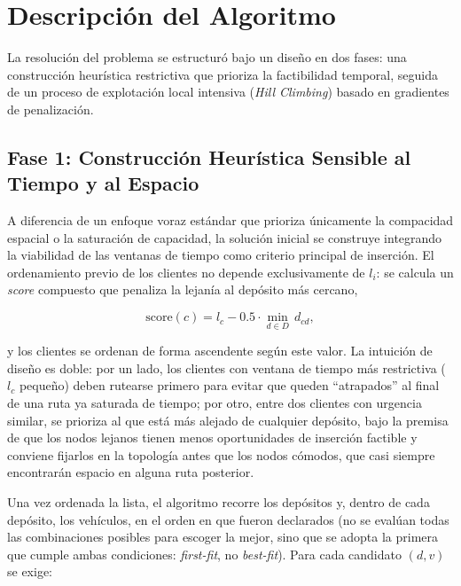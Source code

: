 \documentclass[letter, 10pt]{article}
\begin{document}
\section{Descripci\'on del Algoritmo}

La resoluci\'on del problema se estructur\'o bajo un dise\~no en dos fases: una construcci\'on heur\'istica restrictiva que prioriza la factibilidad temporal, seguida de un proceso de explotaci\'on local intensiva (\textit{Hill Climbing}) basado en gradientes de penalizaci\'on.

\subsection{Fase 1: Construcci\'on Heur\'istica Sensible al Tiempo y al Espacio}

A diferencia de un enfoque voraz est\'andar que prioriza \'unicamente la compacidad espacial o la saturaci\'on de capacidad, la soluci\'on inicial se construye integrando la viabilidad de las ventanas de tiempo como criterio principal de inserci\'on. El ordenamiento previo de los clientes no depende exclusivamente de $l_i$: se calcula un \textit{score} compuesto que penaliza la lejan\'ia al dep\'osito m\'as cercano,

\begin{equation}
\text{score}(c) = l_c - 0.5 \cdot \min_{d \in D} \, d_{cd},
\end{equation}

y los clientes se ordenan de forma ascendente seg\'un este valor. La intuici\'on de dise\~no es doble: por un lado, los clientes con ventana de tiempo m\'as restrictiva ($l_c$ peque\~no) deben rutearse primero para evitar que queden ``atrapados'' al final de una ruta ya saturada de tiempo; por otro, entre dos clientes con urgencia similar, se prioriza al que est\'a m\'as alejado de cualquier dep\'osito, bajo la premisa de que los nodos lejanos tienen menos oportunidades de inserci\'on factible y conviene fijarlos en la topolog\'ia antes que los nodos c\'omodos, que casi siempre encontrar\'an espacio en alguna ruta posterior.

Una vez ordenada la lista, el algoritmo recorre los dep\'ositos y, dentro de cada dep\'osito, los veh\'iculos, en el orden en que fueron declarados (no se eval\'uan todas las combinaciones posibles para escoger la mejor, sino que se adopta la primera que cumple ambas condiciones: \textit{first-fit}, no \textit{best-fit}). Para cada candidato $(d, v)$ se exige:
\end{document}
